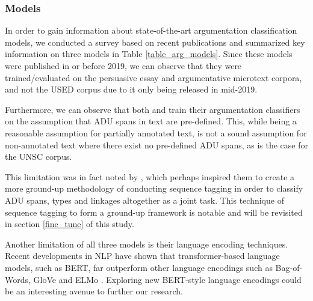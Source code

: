 \subsubsection{Models}
\label{models}

In order to gain information about state-of-the-art argumentation classification models, we conducted a survey based on recent publications and summarized key information on three models in Table \ref{table_arg_models}. Since these models were published in or before 2019, we can observe that they were trained/evaluated on the persuasive essay and argumentative microtext corpora, and not the USED corpus due to it only being released in mid-2019.

Furthermore, we can observe that both \citet{potash2016heres} and \cite{kuribayashi2019empirical} train their argumentation classifiers on the assumption that ADU spans in text are pre-defined. This, while being a reasonable assumption for partially annotated text, is not a sound assumption for non-annotated text where there exist no pre-defined ADU spans, as is the case for the UNSC corpus.

This limitation was in fact noted by \citet{eger2017neural}, which perhaps inspired them to create a more ground-up methodology of conducting sequence tagging in order to classify ADU spans, types and linkages altogether as a joint task. This technique of sequence tagging to form a ground-up framework is notable and will be revisited in section \ref{fine_tune} of this study.

Another limitation of all three models is their language encoding techniques. Recent developments in NLP have shown that transformer-based language models, such as BERT, far outperform other language encodings such as Bag-of-Words, GloVe and ELMo \citep{devlin2018bert}. Exploring new BERT-style language encodings could be an interesting avenue to further our research.

